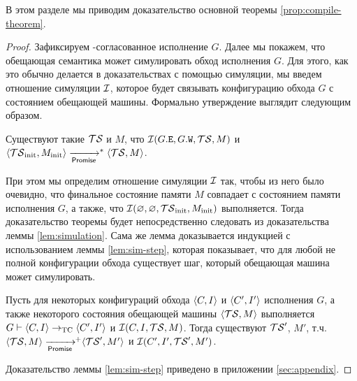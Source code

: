 В этом разделе мы приводим доказательство основной теоремы \ref{prop:compile-theorem}.
\begin{proof}
  Зафиксируем \ARM-согласованное исполнение $G$. Далее мы покажем, что обещающая семантика может симулировать
  обход исполнения $G$. Для этого, как это обычно делается в доказательствах с помощью симуляции, мы введем
  отношение симуляции $\mathcal{I}$, которое будет связывать конфигурацию обхода $G$ с состоянием обещающей машины.
  Формально утверждение выглядит следующим образом.
\begin{lemma}
  \label{lem:simulation}
  Существуют такие $\mathcal{TS}$ и $M$, что $\mathcal{I}(G.{\mathtt{E}}, G.{\mathtt{W}}, \mathcal{TS}, M)$ и
  $\tup{\TSf_{\rm init}, M_{\rm init}} \stepp^{*} \tup{\TSf, M}$.
\end{lemma}
  При этом мы определим отношение симуляции $\mathcal{I}$ так, чтобы из него было очевидно, что финальное состояние памяти
  $M$ совпадает с состоянием памяти исполнения $G$, а также, что $\mathcal{I}(\varnothing, \varnothing, \mathcal{TS}_{\rm init}, M_{\rm init})$
  выполняется. Тогда доказательство теоремы будет непосредственно следовать из доказательства леммы \ref{lem:simulation}.
  Сама же лемма доказывается индукцией с использованием леммы \ref{lem:sim-step}, которая показывает,
  что для любой не полной конфигурации обхода существует шаг, который обещающая машина может симулировать. 
\begin{lemma}
  \label{lem:sim-step}
  Пусть для некоторых конфигураций обхода ${\langle{C, I}\rangle}$ и ${\langle{C', I'}\rangle}$ исполнения $G$,
  а также некоторого состояния обещающей машины ${\langle{\ensuremath{\mathcal{TS}}, M}\rangle}$ выполняется
  $G \vdash {\langle{C, I}\rangle} \rightarrow_{\rm TC} {\langle{C', I'}\rangle}$ и
  $\mathcal{I}(C, I, \mathcal{TS}, M)$.
  Тогда существуют $\mathcal{TS}'$, $M'$, т.ч. $\tup{\TSf, M} \stepp\!\!^{+} \tup{\TSf', M'}$ и
  $\mathcal{I}(C', I', \mathcal{TS}', M')$.
\end{lemma}
  Доказательство леммы \ref{lem:sim-step} приведено в приложении \ref{sec:appendix}.
\end{proof}
  
